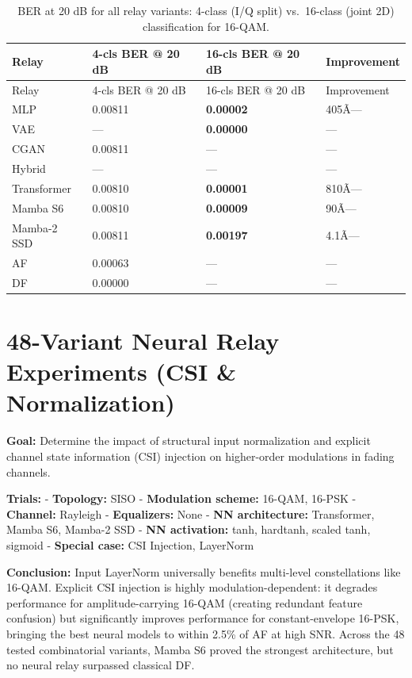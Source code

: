 \begin{longtable}[]{@{}llll@{}}
\caption{BER at 20 dB for all relay variants: 4-class (I/Q split) vs.~16-class (joint 2D) classification for 16-QAM.}\label{tbl:table24}\tabularnewline
\toprule\noalign{}
Relay & 4-cls BER @ 20 dB & 16-cls BER @ 20 dB & Improvement \\
\midrule\noalign{}
\endfirsthead
\toprule\noalign{}
Relay & 4-cls BER @ 20 dB & 16-cls BER @ 20 dB & Improvement \\
\midrule\noalign{}
\endhead
\bottomrule\noalign{}
\endlastfoot
MLP & 0.00811 & \textbf{0.00002} & 405Ã— \\
VAE & --- & \textbf{0.00000} & --- \\
CGAN & 0.00811 & --- & --- \\
Hybrid & --- & --- & --- \\
Transformer & 0.00810 & \textbf{0.00001} & 810Ã— \\
Mamba S6 & 0.00810 & \textbf{0.00009} & 90Ã— \\
Mamba-2 SSD & 0.00811 & \textbf{0.00197} & 4.1Ã— \\
AF & 0.00063 & --- & --- \\
DF & 0.00000 & --- & --- \\
\end{longtable}



\chapter{48-Variant Neural Relay Experiments (CSI \& Normalization)}\label{chap:app-csi}
\textbf{Goal:} Determine the impact of structural input normalization and explicit channel state information (CSI) injection on higher-order modulations in fading channels.

\textbf{Trials:} - \textbf{Topology:} SISO - \textbf{Modulation scheme:} 16-QAM, 16-PSK - \textbf{Channel:} Rayleigh - \textbf{Equalizers:} None - \textbf{NN architecture:} Transformer, Mamba S6, Mamba-2 SSD - \textbf{NN activation:} tanh, hardtanh, scaled tanh, sigmoid - \textbf{Special case:} CSI Injection, LayerNorm

\textbf{Conclusion:} Input LayerNorm universally benefits multi-level constellations like 16-QAM. Explicit CSI injection is highly modulation-dependent: it degrades performance for amplitude-carrying 16-QAM (creating redundant feature confusion) but significantly improves performance for constant-envelope 16-PSK, bringing the best neural models to within 2.5\% of AF at high SNR. Across the 48 tested combinatorial variants, Mamba S6 proved the strongest architecture, but no neural relay surpassed classical DF.

